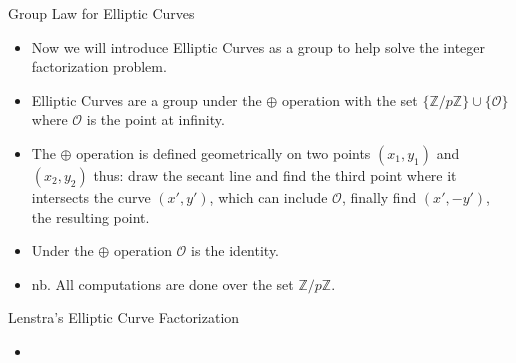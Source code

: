 \documentclass{beamer}
\begin{document}
	\begin{frame}{Group Law for Elliptic Curves}
		\begin{itemize}
			\item Now we will introduce Elliptic Curves as a group to help solve the integer factorization problem.
			\item Elliptic Curves are a group under the $\oplus$ operation with the set $\lbrace \mathbb{Z}/p\mathbb{Z} \rbrace \cup \lbrace \mathcal{O} \rbrace$ where $\mathcal{O}$ is the point at infinity.
			\item The $\oplus$ operation is defined geometrically on two points $(x_1,y_1)$ and $(x_2,y_2)$ thus: draw the secant line and find the third point where it intersects the curve $(x',y')$, which can include $\mathcal{O}$, finally find $(x',-y')$, the resulting point.
			\item Under the $\oplus$ operation $\mathcal{O}$ is the identity.
			\item nb. All computations are done over the set $\mathbb{Z}/p\mathbb{Z}$.
		\end{itemize}
	\end{frame}
	
	\begin{frame}{Lenstra's Elliptic Curve Factorization}
		\begin{itemize}
			\item
		\end{itemize}
	\end{frame}
\end{document}
